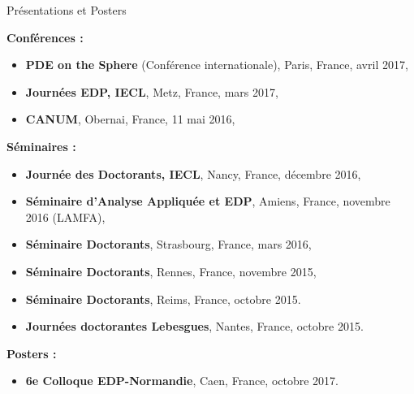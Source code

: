 \documentclass[10pt,a4paper]{report}
\def\cvpart{\noindent \hrulefill}
\def\sp{\vspace{6mm}}
\begin{document}
\sp
\noindent
{\selectfont
\begin{Large}
Présentations et Posters
\end{Large}
\cvpart
}
\sp

\noindent
{\selectfont
\textbf{Conférences :}
}

\begin{itemize}
\item \textbf{PDE on the Sphere} (Conférence internationale), Paris, France, avril 2017,
\item \textbf{Journées EDP, IECL}, Metz, France, mars 2017,
\item \textbf{CANUM}, Obernai, France, 11 mai 2016,
\end{itemize}

\vspace{0.3cm}
\noindent
{\selectfont
\textbf{Séminaires :}
}

\begin{itemize}
\item \textbf{Journée des Doctorants, IECL}, Nancy, France, décembre 2016,
\item \textbf{Séminaire d'Analyse Appliquée et EDP}, Amiens, France, novembre 2016 (LAMFA),
\item \textbf{Séminaire Doctorants}, Strasbourg, France, mars 2016,
\item \textbf{Séminaire Doctorants}, Rennes, France, novembre 2015,
\item \textbf{Séminaire Doctorants}, Reims, France, octobre 2015.
\item \textbf{Journées doctorantes Lebesgues}, Nantes, France, octobre 2015.
\end{itemize}

\vspace{0.3cm}
\noindent
{\selectfont
\textbf{Posters :}
}

\begin{itemize}
\item \textbf{6e Colloque EDP-Normandie}, Caen, France, octobre 2017.
\end{itemize}
\end{document}
